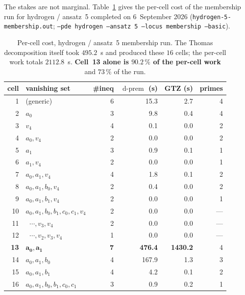 \documentclass[11pt]{article}
\newcommand{\code}[1]{\texttt{#1}}
\newcommand{\dprem}{\operatorname{d-prem}}
\theoremstyle{plain}
\theoremstyle{definition}
\theoremstyle{remark}
\begin{document}
The stakes are not marginal. Table~\ref{tab:hydrogen5} gives the per-cell cost
of the membership run for hydrogen / ansatz~5 completed on 6~September 2026
(\code{hydrogen-5-membership.out}; \code{--pde hydrogen --ansatz 5 --locus
membership --basic}).

\begin{table}[htbp]
\centering
\small
\begin{tabular}{r l r r r r}
\toprule
cell & vanishing set & \#ineq & $\dprem$ (s) & GTZ (s) & primes \\
\midrule
 1 & (generic)                                 & 6 &  15.3 &    2.7 & 4 \\
 2 & $a_0$                                     & 3 &   9.8 &    0.4 & 4 \\
 3 & $v_4$                                     & 4 &   0.1 &    0.0 & 2 \\
 4 & $a_0, v_4$                                & 2 &   0.0 &    0.0 & 2 \\
 5 & $a_1$                                     & 3 &   0.9 &    0.1 & 1 \\
 6 & $a_1, v_4$                                & 2 &   0.0 &    0.0 & 1 \\
 7 & $a_0, a_1, v_4$                           & 4 &   1.8 &    0.1 & 2 \\
 8 & $a_0, a_1, b_0, v_4$                      & 2 &   0.4 &    0.0 & 2 \\
 9 & $a_0, a_1, b_1, v_4$                      & 2 &   0.0 &    0.0 & 1 \\
10 & $a_0, a_1, b_0, b_1, c_0, c_1, v_4$       & 2 &   0.0 &    0.0 & --- \\
11 & $\;\;\cdots, v_3, v_4$                    & 2 &   0.0 &    0.0 & --- \\
12 & $\;\;\cdots, v_2, v_3, v_4$               & 1 &   0.0 &    0.0 & --- \\
\textbf{13} & $\mathbf{a_0, a_1}$              & \textbf{7} & \textbf{476.4} & \textbf{1430.2} & 4 \\
14 & $a_0, a_1, b_0$                           & 4 & 167.9 &    1.3 & 3 \\
15 & $a_0, a_1, b_1$                           & 4 &   4.2 &    0.1 & 2 \\
16 & $a_0, a_1, b_0, b_1, c_0, c_1$            & 3 &   0.9 &    0.2 & 1 \\
\bottomrule
\end{tabular}
\caption{Per-cell cost, hydrogen / ansatz~5 membership run. The Thomas
decomposition itself took $495.2$~s and produced these $16$ cells; the
per-cell work totals $2112.8$~s. \textbf{Cell~13 alone is $90.2\,\%$ of the
per-cell work} and $73\,\%$ of the run.}
\label{tab:hydrogen5}
\end{table}
\end{document}
